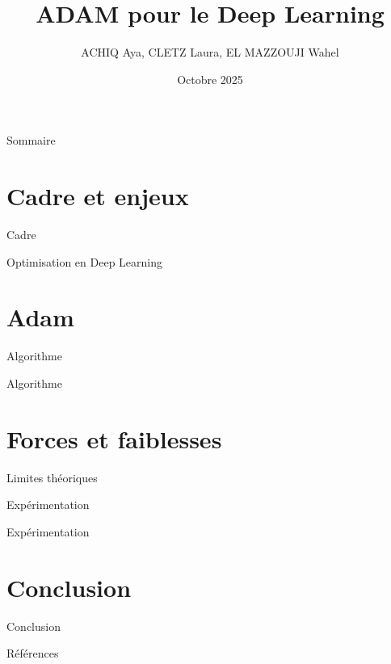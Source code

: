 \documentclass{beamer}
\title{ADAM pour le Deep Learning}
\author{ACHIQ Aya, CLETZ Laura, EL MAZZOUJI Wahel}
\date{\footnotesize Octobre 2025}
\begin{document}
\begin{frame}

  \titlepage

\end{frame}

\begin{frame}{Sommaire}

  \tableofcontents

\end{frame}

\section{Cadre et enjeux}

\begin{frame}{Cadre}
  \cite{kingma2014}
\end{frame}

\begin{frame}{Optimisation en Deep Learning}
\end{frame}

\section{Adam}

\begin{frame}{Algorithme}
\end{frame}

\begin{frame}{Algorithme}

\end{frame}

\section{Forces et faiblesses}

\begin{frame}{Limites théoriques}
\end{frame}

\begin{frame}{Expérimentation}
\end{frame}

\begin{frame}{Expérimentation}
\end{frame}

\section{Conclusion}

\begin{frame}{Conclusion}
\end{frame}

\begin{frame}{Références}
  \renewcommand*{\bibfont}{\small}
  \printbibliography[heading=none]
\end{frame}
\end{document}
